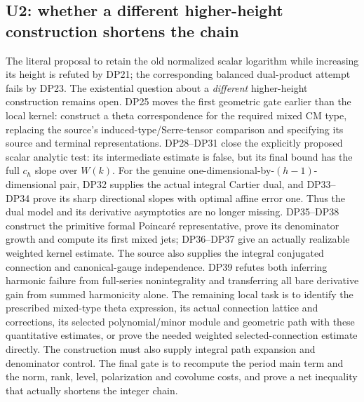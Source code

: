 \documentclass[11pt,a4paper]{article}
\theoremstyle{definition}\newtheorem{remark}[theorem]{Remark}
\begin{document}
\subsection{U2: whether a different higher-height construction shortens the chain}

The literal proposal to retain the old normalized scalar logarithm while increasing its height is refuted by DP21; the corresponding balanced dual-product attempt fails by DP23. The existential question about a \emph{different} higher-height construction remains open. DP25 moves the first geometric gate earlier than the local kernel: construct a theta correspondence for the required mixed CM type, replacing the source's induced-type/Serre-tensor comparison and specifying its source and terminal representations. DP28--DP31 close the explicitly proposed scalar analytic test: its intermediate estimate is false, but its final bound has the full $c_h$ slope over $W(k)$. For the genuine one-dimensional-by-$(h-1)$-dimensional pair, DP32 supplies the actual integral Cartier dual, and DP33--DP34 prove its sharp directional slopes with optimal affine error one. Thus the dual model and its derivative asymptotics are no longer missing. DP35--DP38 construct the primitive formal Poincar\'e representative, prove its denominator growth and compute its first mixed jets; DP36--DP37 give an actually realizable weighted kernel estimate. The source also supplies the integral conjugated connection and canonical-gauge independence. DP39 refutes both inferring harmonic failure from full-series nonintegrality and transferring all bare derivative gain from summed harmonicity alone. The remaining local task is to identify the prescribed mixed-type theta expression, its actual connection lattice and corrections, its selected polynomial/minor module and geometric path with these quantitative estimates, or prove the needed weighted selected-connection estimate directly. The construction must also supply integral path expansion and denominator control. The final gate is to recompute the period main term and the norm, rank, level, polarization and covolume costs, and prove a net inequality that actually shortens the integer chain.
\end{document}
